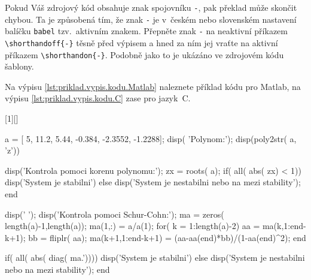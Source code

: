 \vspace{\fill}

Pokud Váš zdrojový kód obsahuje znak spojovníku \verb|-|, pak překlad může skončit chybou.
Ta je způsobená tím, že znak \verb|-| je v~českém nebo slovenském nastavení balíčku \verb|babel| tzv.\ aktivním znakem.
Přepněte znak \verb|-| na neaktivní příkazem \verb|\shorthandoff{-}| těsně před výpisem a hned za ním jej vraťte na aktivní příkazem \verb|\shorthandon{-}|.
Podobně jako to je ukázáno ve zdrojovém kódu šablony.


\clearpage

Na výpisu \ref{lst:priklad.vypis.kodu.Matlab} naleznete příklad kódu pro Matlab, na výpisu \ref{lst:priklad.vypis.kodu.C} zase pro jazyk~C.

[1][]{%
%
\lstset{language=Matlab,numbers=left,#1}%
}{%
%
}

\begin{matlab}[frame=single,float=htbp,caption={Příklad Schur-Cohnova testu stability v~prostředí Matlab.},label=lst:priklad.vypis.kodu.Matlab,numberstyle=\scriptsize, numbersep=7pt]

a = [ 5, 11.2, 5.44, -0.384, -2.3552, -1.2288];
disp( 'Polynom:'); disp(poly2str( a, 'z'))

disp('Kontrola pomoci korenu polynomu:');
zx = roots( a);
if( all( abs( zx) < 1))
    disp('System je stabilni')
else
    disp('System je nestabilni nebo na mezi stability');
end

disp(' '); disp('Kontrola pomoci Schur-Cohn:');
ma = zeros( length(a)-1,length(a));
ma(1,:) = a/a(1);
for( k = 1:length(a)-2)
    aa = ma(k,1:end-k+1);
    bb = fliplr( aa);
    ma(k+1,1:end-k+1) = (aa-aa(end)*bb)/(1-aa(end)^2);
end

if( all( abs( diag( ma.'))))
    disp('System je stabilni')
else
    disp('System je nestabilni nebo na mezi stability');
end
\end{matlab}

